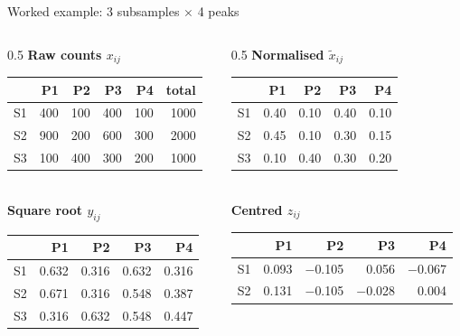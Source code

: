 \documentclass[aspectratio=169,10pt]{beamer}
\begin{document}
\begin{frame}{Worked example: 3 subsamples $\times$ 4 peaks}
  \scriptsize
  \begin{columns}[T]
    \begin{column}{0.5\textwidth}
      \textbf{Raw counts $x_{ij}$}\\[1mm]
      \begin{tabular}{@{}lrrrr|r@{}}
        \toprule & P1 & P2 & P3 & P4 & total\\\midrule
        S1 & 400 & 100 & 400 & 100 & 1000\\
        S2 & 900 & 200 & 600 & 300 & 2000\\
        S3 & 100 & 400 & 300 & 200 & 1000\\\bottomrule
      \end{tabular}\\[3mm]
      \textbf{Square root $y_{ij}$}\\[1mm]
      \begin{tabular}{@{}lrrrr@{}}
        \toprule & P1 & P2 & P3 & P4\\\midrule
        S1 & 0.632 & 0.316 & 0.632 & 0.316\\
        S2 & 0.671 & 0.316 & 0.548 & 0.387\\
        S3 & 0.316 & 0.632 & 0.548 & 0.447\\\bottomrule
      \end{tabular}
    \end{column}
    \begin{column}{0.5\textwidth}
      \textbf{Normalised $\tilde{x}_{ij}$}\\[1mm]
      \begin{tabular}{@{}lrrrr@{}}
        \toprule & P1 & P2 & P3 & P4\\\midrule
        S1 & 0.40 & 0.10 & 0.40 & 0.10\\
        S2 & 0.45 & 0.10 & 0.30 & 0.15\\
        S3 & 0.10 & 0.40 & 0.30 & 0.20\\\bottomrule
      \end{tabular}\\[3mm]
      \textbf{Centred $z_{ij}$}\\[1mm]
      \begin{tabular}{@{}lrrrr@{}}
        \toprule & P1 & P2 & P3 & P4\\\midrule
        S1 & 0.093 & $-$0.105 & 0.056 & $-$0.067\\
        S2 & 0.131 & $-$0.105 & $-$0.028 & 0.004\\

\end{tabular}
\end{column}
\end{columns}
\end{frame}
\end{document}
